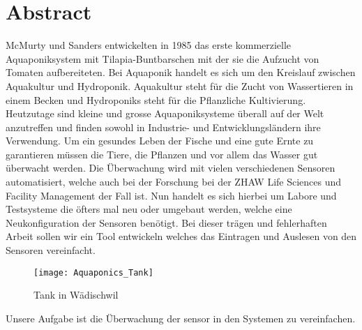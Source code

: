 \documentclass[../main.tex]{subfiles}
\begin{document}
	
		
	\section*{Abstract}
	McMurty und Sanders entwickelten in 1985 das erste kommerzielle Aquaponiksystem mit Tilapia-Buntbarschen mit der sie die Aufzucht von Tomaten aufbereiteten. Bei Aquaponik handelt es sich um den Kreislauf zwischen Aquakultur und Hydroponik. Aquakultur steht für die Zucht von Wassertieren in einem Becken und Hydroponiks steht für die Pflanzliche Kultivierung. Heutzutage sind kleine und grosse Aquaponiksysteme überall auf der Welt anzutreffen und finden sowohl in Industrie- und Entwicklungsländern ihre Verwendung. Um ein gesundes Leben der Fische und eine gute Ernte zu garantieren müssen die Tiere, die Pflanzen und vor allem das Wasser gut überwacht werden. Die Überwachung wird mit vielen verschiedenen Sensoren automatisiert, welche auch bei der Forschung bei der ZHAW Life Sciences und Facility Management der Fall ist. Nun handelt es sich hierbei um Labore und Testsysteme die öfters mal neu oder umgebaut werden, welche eine Neukonfiguration der Sensoren benötigt. Bei dieser trägen und fehlerhaften Arbeit sollen wir ein Tool entwickeln welches das Eintragen und Auslesen von den Sensoren vereinfacht.\\
	
	\begin{figure}[H]
		\centering
		\texttt{[image: Aquaponics\_Tank]}
		\caption{Tank in Wädischwil}
		\label{fig:Aquaponics_Tank}
	\end{figure}
	\par \noindent
	Unsere Aufgabe ist die Überwachung der \gls{sensor} in den Systemen zu vereinfachen. \\
	
\end{document}
